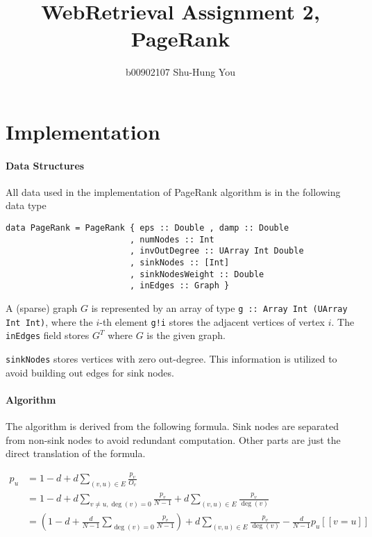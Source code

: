 \documentclass{article}
\begin{document}
\title{WebRetrieval Assignment 2, PageRank}
\date{}
\author{b00902107 Shu-Hung You}
\maketitle
\section{Implementation}
\paragraph{Data Structures} All data used in the implementation of
PageRank algorithm is in the following data type

\begin{verbatim}
data PageRank = PageRank { eps :: Double , damp :: Double
                         , numNodes :: Int
                         , invOutDegree :: UArray Int Double
                         , sinkNodes :: [Int]
                         , sinkNodesWeight :: Double
                         , inEdges :: Graph }
\end{verbatim}

A (sparse) graph $G$ is represented by an array of type
\texttt{g :: Array Int (UArray Int Int)}, where the $i$-th element \texttt{g!i}
stores the adjacent vertices of vertex $i$. The \texttt{inEdges} field stores
$G^T$ where $G$ is the given graph.

\texttt{sinkNodes} stores vertices with zero out-degree. This information is
utilized to avoid building out edges for sink nodes.

\paragraph{Algorithm} The algorithm is derived from the following formula.
Sink nodes are separated from non-sink nodes to avoid redundant computation.
Other parts are just the direct translation of the formula.

\[\begin{aligned}
p_u
&= 1-d + d\sum_{(v,u)\in E}\frac{p_v}{O_v} \\
&= 1-d + d\sum_{v\ne u,\deg(v)=0}\frac{p_v}{N-1} + d\sum_{(v,u)\in E}\frac{p_v}{\deg(v)} \\
&= \left(1-d + \frac{d}{N-1}\sum_{\deg(v)=0}\frac{p_v}{N-1}\right) + d\sum_{(v,u)\in E}\frac{p_v}{\deg(v)} - \frac{d}{N-1} p_u[\![ v=u ]\!]
\end{aligned}\]
\end{document}
